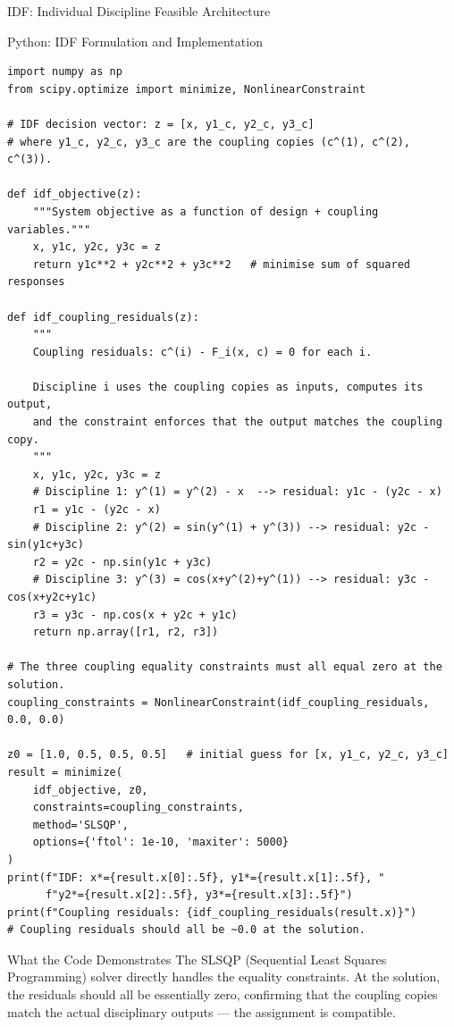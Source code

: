 \documentclass[aspectratio=169,10pt]{beamer}
\begin{document}
\begin{frame}[allowframebreaks]{IDF: Individual Discipline Feasible Architecture}
\end{frame}

\begin{frame}[fragile]{Python: IDF Formulation and Implementation}

  \begin{lstlisting}[style=python]
import numpy as np
from scipy.optimize import minimize, NonlinearConstraint

# IDF decision vector: z = [x, y1_c, y2_c, y3_c]
# where y1_c, y2_c, y3_c are the coupling copies (c^(1), c^(2), c^(3)).

def idf_objective(z):
    """System objective as a function of design + coupling variables."""
    x, y1c, y2c, y3c = z
    return y1c**2 + y2c**2 + y3c**2   # minimise sum of squared responses

def idf_coupling_residuals(z):
    """
    Coupling residuals: c^(i) - F_i(x, c) = 0 for each i.

    Discipline i uses the coupling copies as inputs, computes its output,
    and the constraint enforces that the output matches the coupling copy.
    """
    x, y1c, y2c, y3c = z
    # Discipline 1: y^(1) = y^(2) - x  --> residual: y1c - (y2c - x)
    r1 = y1c - (y2c - x)
    # Discipline 2: y^(2) = sin(y^(1) + y^(3)) --> residual: y2c - sin(y1c+y3c)
    r2 = y2c - np.sin(y1c + y3c)
    # Discipline 3: y^(3) = cos(x+y^(2)+y^(1)) --> residual: y3c - cos(x+y2c+y1c)
    r3 = y3c - np.cos(x + y2c + y1c)
    return np.array([r1, r2, r3])

# The three coupling equality constraints must all equal zero at the solution.
coupling_constraints = NonlinearConstraint(idf_coupling_residuals, 0.0, 0.0)

z0 = [1.0, 0.5, 0.5, 0.5]   # initial guess for [x, y1_c, y2_c, y3_c]
result = minimize(
    idf_objective, z0,
    constraints=coupling_constraints,
    method='SLSQP',
    options={'ftol': 1e-10, 'maxiter': 5000}
)
print(f"IDF: x*={result.x[0]:.5f}, y1*={result.x[1]:.5f}, "
      f"y2*={result.x[2]:.5f}, y3*={result.x[3]:.5f}")
print(f"Coupling residuals: {idf_coupling_residuals(result.x)}")
# Coupling residuals should all be ~0.0 at the solution.
  \end{lstlisting}

  \begin{block}{What the Code Demonstrates}
    The SLSQP (Sequential Least Squares Programming) solver directly
    handles the equality constraints.  At the solution, the residuals
    should all be essentially zero, confirming that the coupling copies
    match the actual disciplinary outputs --- the assignment is compatible.
  \end{block}

\end{frame}
\end{document}
